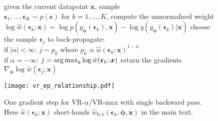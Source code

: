 \begin{figure}[!t]
\begin{minipage}[b]{0.55\linewidth}
\centering
\begin{algorithm}[H] 
\caption{One gradient step for VR-$\alpha$/VR-max with single backward pass. Here $\hat{w}(\bm{\epsilon}_k; \bm{x})$ short-hands $\hat{w}_{0, k}(\bm{\epsilon}_k; \bm{\phi}, \bm{x})$ in the main text.} \small
\label{alg:vr_max} 
\begin{algorithmic}[1] 
	\STATE given the current datapoint $\bm{x}$, sample \\$\bm{\epsilon}_1, ..., \bm{\epsilon}_K \sim p(\bm{\epsilon})$
	\STATE for $k = 1, ..., K$, compute the unnormalised weight \\
	$\log \hat{w}(\bm{\epsilon}_k; \bm{x}) = \log p(g_{\bm{\phi}}(\bm{\epsilon}_k), \bm{x}) - \log q(g_{\bm{\phi}}(\bm{\epsilon}_k)|\bm{x})$
	\STATE choose the sample $\bm{\epsilon}_{j}$ to back-propagate: \\
	if $|\alpha| < \infty$: $j \sim p_k$ where $p_k \propto \hat{w}(\bm{\epsilon}_k; \bm{x})^{1 - \alpha}$ \\
	if $\alpha = -\infty$: $j = \operatorname*{arg\,max}_{k} \log \hat{w}(\bm{\epsilon}_k; \bm{x})$ 
	\STATE return the gradients $\nabla_{\bm{\phi}} \log \hat{w}(\bm{\epsilon}_{j}; \bm{x})$
\end{algorithmic}
\end{algorithm}
\end{minipage}
%
\hfill
\begin{minipage}[b]{0.4\linewidth}
\centering
 \texttt{[image: vr\_ep\_relationship.pdf]} 
 \vspace{-0.1in}
 \label{fig:vr_ep_relationship}
\end{minipage}
%
\end{figure}

